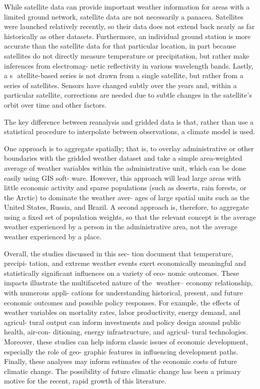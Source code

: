 \documentclass[
]{book}
\begin{document}
While satellite data can provide important
weather information for areas with a limited
ground network, satellite data are not
necessarily a panacea. Satellites were launched
relatively recently, so their data does not
extend back nearly as far historically as
other ­datasets. Furthermore, an individual
ground station is more accurate than the
satellite data for that particular location,
in part because satellites do not directly
measure temperature or precipitation, but
rather make inferences from electromag-
netic reflectivity in various wavelength
bands. Lastly, a s ­ atellite-based series is not
drawn from a single satellite, but rather
from a series of satellites. Sensors have
changed subtly over the years and, within a
particular satellite, corrections are needed
due to subtle changes in the satellite's orbit
over time and other factors.

The key difference between
reanalysis and gridded data is that, rather
than use a statistical procedure to interpolate
between observations, a climate model
is used.

One approach is to aggregate spatially;
that is, to overlay administrative or other
boundaries with the gridded weather dataset
and take a simple area-weighted average of
weather variables within the administrative
unit, which can be done easily using GIS soft-
ware. However, this approach will lead large
areas with little economic activity and sparse
populations (such as deserts, rain forests, or
the Arctic) to dominate the weather aver-
ages of large spatial units such as the United
States, Russia, and Brazil. A second approach
is, therefore, to aggregate using a fixed set
of population weights, so that the relevant
concept is the average weather experienced
by a person in the administrative area, not
the average weather experienced by a place.

Overall, the studies discussed in this sec-
tion document that temperature, precipi-
tation, and extreme weather events exert
economically meaningful and statistically
significant influences on a variety of eco-
nomic outcomes. These impacts illustrate
the multifaceted nature of the ­
weather--
economy relationship, with numerous appli-
cations for understanding historical, present,
and future economic outcomes and possible
policy responses. For example, the effects of
weather variables on mortality rates, labor
productivity, energy demand, and agricul-
tural output can inform investments and
policy design around public health, air-con-
ditioning, energy infrastructure, and agricul-
tural technologies. Moreover, these studies
can help inform classic issues of economic
development, especially the role of geo-
graphic features in influencing development
paths. Finally, these analyses may inform
estimates of the economic costs of future
climatic change. The possibility of future
climatic change has been a primary motive
for the recent, rapid growth of this literature.
\end{document}
